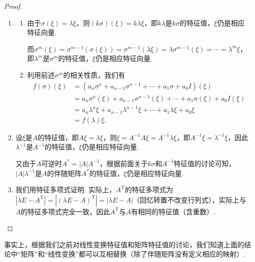 \begin{proof}
    \begin{enumerate}
        \item \begin{enumerate}
                  \item 由于$\sigma(\xi)=\lambda\xi$，则$(k\sigma)(\xi)=k\lambda\xi$，即$k\lambda$是$k\sigma$的特征值，$\xi$仍是相应特征向量.

                        而$\sigma^m(\xi)=\sigma^{m-1}(\sigma(\xi))=\sigma^{m-1}(\lambda\xi)=\lambda\sigma^{m-1}(\xi)=\cdots=\lambda^m\xi$，即$\lambda^m$是$\sigma^m$的特征值，$\xi$仍是相应特征向量.

                  \item 利用前述$\sigma^m$的相关性质，我们有
                        \begin{align*}
                            f(\sigma)(\xi) & = (a_n\sigma^n+a_{n-1}\sigma^{n-1}+\cdots+a_1\sigma+a_0I)(\xi)              \\
                                           & = a_n\sigma^n(\xi)+a_{n-1}\sigma^{n-1}(\xi)+\cdots+a_1\sigma(\xi)+a_0I(\xi) \\
                                           & = a_n\lambda^n\xi+a_{n-1}\lambda^{n-1}\xi+\cdots+a_1\lambda\xi+a_0\xi       \\
                                           & = f(\lambda)\xi.
                        \end{align*}
              \end{enumerate}

        \item 设$\xi$是$A$的特征值，即$A\xi=\lambda\xi$，则$\xi=A^{-1}A\xi=A^{-1}\lambda\xi$，即$A^{-1}\xi=\lambda^{-1}\xi$，因此$\lambda^{-1}$是$A^{-1}$的特征值，$\xi$仍是相应特征向量.

              又由于$A$可逆时$A^*=|A|A^{-1}$，根据前面关于$k\sigma$和$A^{-1}$特征值的讨论可知，$|A|\lambda^{-1}$是$A$的伴随矩阵$A^*$的特征值，$\xi$仍是相应特征向量.

        \item 我们用特征多项式证明. 实际上，$A^\mathrm{T}$的特征多项式为$|\lambda E-A^\mathrm{T}|=|(\lambda E-A)^\mathrm{T}|=|\lambda E-A|$（回忆转置不改变行列式），实际上与$A$的特征多项式完全一致，因此$A^\mathrm{T}$与$A$有相同的特征值（含重数）.
    \end{enumerate}
\end{proof}

事实上，根据我们之前对线性变换特征值和矩阵特征值的讨论，我们知道上面的结论中``矩阵''和``线性变换''都可以互相替换（除了伴随矩阵没有定义相应的映射）.

